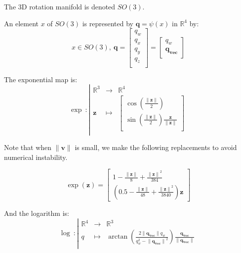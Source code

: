 The 3D rotation manifold is denoted $SO(3)$.

An element $x$ of $SO(3)$ is represented by $\mathbf{q}=\psi(x)$ in $\mathbb{R}^{4}$ by:
\begin{equation}
  x\in SO(3),\ \mathbf{q} =\begin{bmatrix}
    q_{w}\\
    q_{x}\\
    q_{y}\\
    q_{z}\\
  \end{bmatrix}
  =\begin{bmatrix}
    q_{w}\\
    \mathbf{q_{vec}}\\
  \end{bmatrix}
\end{equation}

The exponential map is:
\begin{equation}
  \exp\ :\left|
  \begin{array}{ccc}
    \mathbb{R}^3 & \rightarrow & \mathbb{R}^4 \\
    \mathbf{z} & \mapsto & \begin{bmatrix}
      \cos \left( \frac{\|\mathbf{z}\|}{2} \right)\\
      \sin \left( \frac{\|\mathbf{z}\|}{2} \right) \frac{\mathbf{z}}{\|\mathbf{z}\|}\\
    \end{bmatrix} \\
  \end{array} \nonumber%
  \right.
\end{equation}

Note that when $\|\mathbf{v}\|$ is small, we make the following replacements to avoid numerical instability.

\begin{equation}
  \exp(\mathbf{z}) = \begin{bmatrix}
    1 -\frac{\|\mathbf{z}\|}{8} + \frac{{\|\mathbf{z}\|}^2}{384}\\
    \left(0.5 - \frac{\|\mathbf{z}\|}{48} + \frac{{\|\mathbf{z}\|}^2}{3840}\right)\mathbf{z}
  \end{bmatrix}
\end{equation}

And the logarithm is:
\begin{equation}
  \log\ :\left|
  \begin{array}{ccc}
    \mathbb{R}^4 & \rightarrow & \mathbb{R}^3 \\
    q & \mapsto & \arctan \left( \frac{2 \|\mathbf{q_{vec}}\| q_w}{q_w^2 - {\|\mathbf{q_{vec}\|}^2}} \right) \frac{\mathbf{q_{vec} } }{\|\mathbf{q_{vec}}\|} \\
  \end{array}
  \right.
\end{equation}

